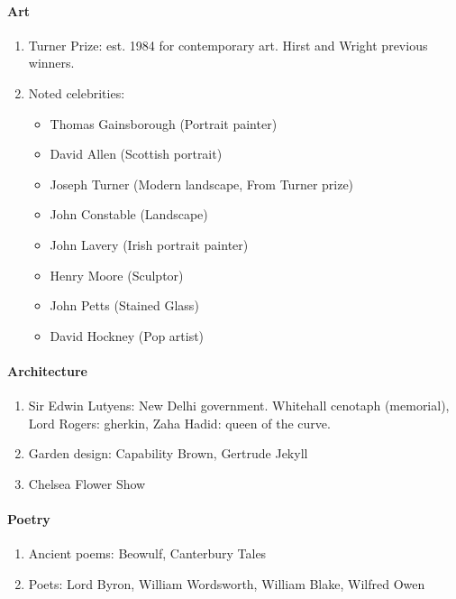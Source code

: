 \documentclass[10pt,reqno]{amsart}
\begin{document}
\paragraph{Art}

\begin{enumerate}[i]
\item Turner Prize: est. 1984 for contemporary art. Hirst and Wright previous winners. 
\item Noted celebrities:
\begin{itemize}
\item Thomas Gainsborough (Portrait painter)
\item David Allen (Scottish portrait)
\item Joseph Turner (Modern landscape, From Turner prize)
\item John Constable (Landscape)
\item John Lavery (Irish portrait painter)
\item Henry Moore (Sculptor)
\item John Petts (Stained Glass)
\item David Hockney (Pop artist)
\end{itemize}
\end{enumerate}


\paragraph{Architecture}

\begin{enumerate}[i]
\item Sir Edwin Lutyens: New Delhi government. Whitehall cenotaph (memorial),
Lord Rogers: gherkin,
Zaha Hadid: queen of the curve.
\item Garden design: Capability Brown, Gertrude Jekyll
\item Chelsea Flower Show
\end{enumerate}

\paragraph{Poetry}

\begin{enumerate}[i]
\item Ancient poems: Beowulf, Canterbury Tales
\item Poets: Lord Byron, William Wordsworth, William Blake, Wilfred Owen
\end{enumerate}
\end{document}
